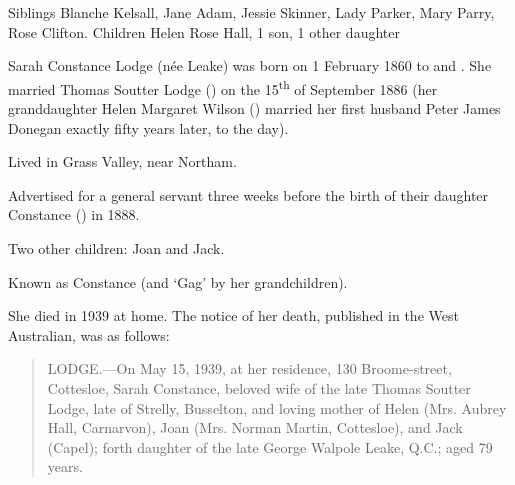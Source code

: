

Siblings 	Blanche Kelsall, Jane Adam, Jessie Skinner, Lady Parker, Mary Parry, Rose Clifton.
Children 	Helen Rose Hall, 1 son, 1 other daughter

Sarah Constance Lodge (n\'{e}e Leake) was born on 1 February 1860 to  and .
She married Thomas Soutter Lodge () on the 15\textsuperscript{th} of September 1886
(her granddaughter Helen Margaret Wilson () married her first husband Peter James Donegan exactly fifty years later, to the day\cite{HMWnote}).

Lived in Grass Valley, near Northam.\cite{ServantAd}

Advertised for a general servant three weeks before the birth of their daughter Constance () in 1888.\cite{ServantAd}

Two other children: Joan and Jack.\cite{SCLdeathNotice}

Known as Constance (and `Gag' by her grandchildren).

She died in 1939 at home.
The notice of her death, published in the West Australian, was as follows:\cite{SCLdeathNotice}

\begin{quotation}
LODGE.---On May 15, 1939, at her residence, 130 Broome-street, Cottesloe, Sarah Constance, beloved wife of the late Thomas Soutter Lodge, late of Strelly, Busselton, and loving mother of Helen (Mrs. Aubrey Hall, Carnarvon), Joan (Mrs. Norman Martin, Cottesloe), and Jack (Capel); forth daughter of the late George Walpole Leake, Q.C.; aged 79 years.
\end{quotation}
